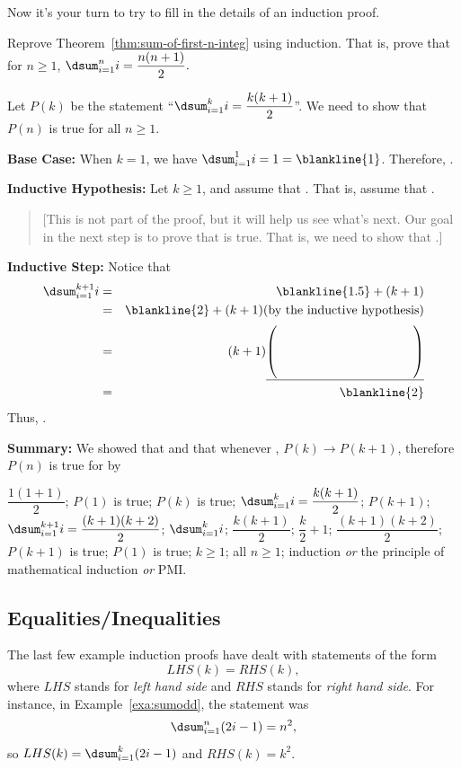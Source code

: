 Now it's your turn to try to fill in the details of an induction proof.

\newpage %

\begin{fib}
Reprove Theorem~\ref{thm:sum-of-first-n-integ} using induction.  That is, prove that
for $n\geq 1$, $\dsum_{i=1}^{n} i = \dfrac{n(n+1)}{2}.$
\begin{pf}
Let $P(k)$ be the statement ``$\dsum_{i=1}^{k} i = \dfrac{k(k+1)}{2}$''.
We need to show that $P(n)$ is true for all $n\geq 1$.

\noindent
{\bf Base Case:} 
When $k=1$, we have
$\dsum_{i=1}^1 i = 1 = \blankline{1}$.  Therefore, .

\noindent
{\bf Inductive Hypothesis:} 
Let $k\geq 1$, and assume that  .
That is, assume that .

\noindent
\begin{quote}
${[}$This is not part of the proof, but it will help us see what's next.
Our goal in the next step is to prove that 
 is true.  That is, we need to show that
.${]}$
\end{quote}
{\bf Inductive Step:}
Notice that
\begin{eqnarray*}
\dsum_{i=1}^{k+1}i&=&\blankline{1.5} + (k+1)\\
&=&\blankline{2}+(k+1) \mbox{(by the inductive hypothesis)}\\
&=&(k+1)\underline{\left(\hspace{1.5in}\rule{.000001in}{.35in}\right)}\\
&=&\blankline{2}
\end{eqnarray*}
Thus, .

\noindent
{\bf Summary: }
We showed that  and that whenever ,
$P(k)\rightarrow P(k+1)$, 
therefore $P(n)$ is true for  by
\end{pf}
\begin{answer}
$\dfrac{1(1+1)}{2}$;
$P(1)$ is true;
$P(k)$ is true;
$\dsum_{i=1}^{k} i = \dfrac{k(k+1)}{2}$;
$P(k+1)$;
$\dsum_{i=1}^{k+1} i = \dfrac{(k+1)(k+2)}{2}$;
$\dsum_{i=1}^{k} i$;
$\dfrac{k(k+1)}{2}$;
$\dfrac{k}{2}+1$;
$\dfrac{(k+1)(k+2)}{2}$;
$P(k+1)$ is true;
$P(1)$ is true;
$k\geq 1$;
all $n\geq 1$;
induction {\em or} the principle of mathematical induction {\em or} PMI.
\end{answer}
\end{fib}

\subsection{Equalities/Inequalities}
The last few example induction proofs have dealt with statements of the form
$$LHS(k)=RHS(k),$$
where $LHS$ stands for {\em left hand side} 
and $RHS$ stands for {\em right hand side}.
For instance, in Example~\ref{exa:sumodd},
the statement was
$$\dsum_{i=1}^{n}(2 i - 1) = n^2,$$
so $LHS(k)=\dsum_{i=1}^{k}(2 i - 1)$ and $RHS(k) = k^2$.


